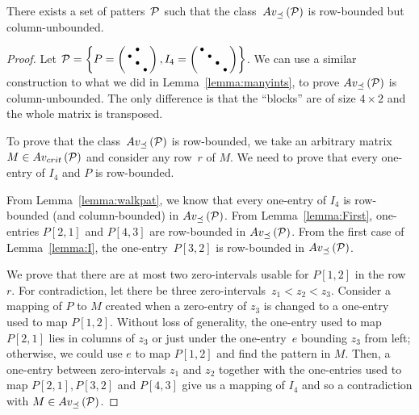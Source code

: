 \begin{lemma}
There exists a set of patters~$\mathcal{P}$ such that the class~$Av_{\preceq}\left(\mathcal{P}\right)$ is row-bounded but column-unbounded.
\end{lemma}
\begin{proof}
Let $\mathcal{P}=\left\lbrace P=\left(\begin{smallmatrix} &\bullet& \\\bullet& & \\ &\bullet& \\ & &\bullet\end{smallmatrix}\right),I_4=\left(\begin{smallmatrix}\bullet& & & \\ &\bullet& & \\ & &\bullet& \\ & & &\bullet\end{smallmatrix}\right)\right\rbrace$. We can use a similar construction to what we did in Lemma~\ref{lemma:manyints}, to prove $Av_{\preceq}\left(\mathcal{P}\right)$ is column-unbounded. The only difference is that the ``blocks'' are of size $4\times2$ and the whole matrix is transposed.

To prove that the class~$Av_{\preceq}\left(\mathcal{P}\right)$ is row-bounded, we take an arbitrary matrix~$M\in Av_{crit}\left(\mathcal{P}\right)$ and consider any row~$r$ of $M$. We need to prove that every one-entry of $I_4$ and $P$ is row-bounded.

From Lemma~\ref{lemma:walkpat}, we know that every one-entry of $I_4$ is row-bounded (and column-bounded) in $Av_{\preceq}\left(\mathcal{P}\right)$. From Lemma~\ref{lemma:First}, one-entries $P[2,1]$ and $P[4,3]$ are row-bounded in $Av_{\preceq}\left(\mathcal{P}\right)$. From the first case of Lemma~\ref{lemma:I}, the one-entry~$P[3,2]$ is row-bounded in $Av_{\preceq}\left(\mathcal{P}\right)$.

We prove that there are at most two zero-intervals usable for $P[1,2]$ in the row~$r$. For contradiction, let there be three zero-intervals~$z_1<z_2<z_3$. Consider a mapping of $P$ to $M$ created when a zero-entry of $z_3$ is changed to a one-entry used to map $P[1,2]$. Without loss of generality, the one-entry used to map $P[2,1]$ lies in columns of $z_3$ or just under the one-entry~$e$ bounding $z_3$ from left; otherwise, we could use $e$ to map $P[1,2]$ and find the pattern in $M$. Then, a one-entry between zero-intervals $z_1$ and $z_2$ together with the one-entries used to map $P[2,1],P[3,2]$ and $P[4,3]$ give us a mapping of $I_4$ and so a contradiction with $M\in Av_{\preceq}\left(\mathcal{P}\right)$.
\end{proof}

